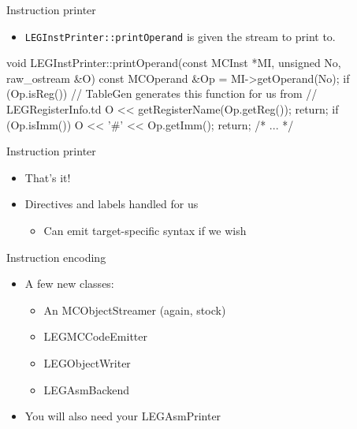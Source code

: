 
\begin{frame}[fragile]{Instruction printer}

\begin{itemize}
    \item \texttt{LEGInstPrinter::printOperand} is given the stream to print to.
\end{itemize}

\begin{codebox}
void LEGInstPrinter::printOperand(const MCInst *MI, unsigned No,
                                  raw_ostream &O) {
  const MCOperand &Op = MI->getOperand(No);
  if (Op.isReg()) {
    // TableGen generates this function for us from   
    // LEGRegisterInfo.td
    O << getRegisterName(Op.getReg());
    return;
  }
  if (Op.isImm()) {
    O << '#' << Op.getImm();
    return;
  }
  /* ... */
}
\end{codebox}

\end{frame}


\begin{frame}{Instruction printer}

\begin{itemize}
    \item That's it!
    \item Directives and labels handled for us
    \begin{itemize}
        \item Can emit target-specific syntax if we wish
    \end{itemize}
\end{itemize}


\end{frame}



\begin{frame}{Instruction encoding}

\begin{itemize}
    \item A few new classes:
    \begin{itemize}
        \item An MCObjectStreamer (again, stock)
        \item LEGMCCodeEmitter
        \item LEGObjectWriter
        \item LEGAsmBackend
    \end{itemize}
    \item You will also need your LEGAsmPrinter
\end{itemize}

\end{frame}

